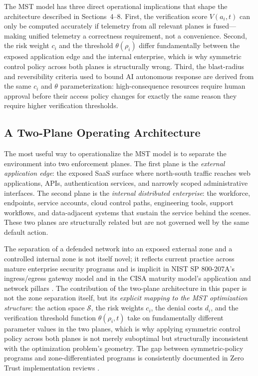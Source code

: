 \documentclass[acmlarge]{acmart}
\begin{document}
The MST model has three direct operational implications that shape the
architecture described in Sections~4--8. First, the verification score
$V(a_i, t)$ can only be computed accurately if telemetry from all relevant
planes is fused---making unified telemetry a correctness requirement, not a
convenience. Second, the risk weight $c_i$ and the threshold $\theta(\rho_i)$
differ fundamentally between the exposed application edge and the internal enterprise,
which is why symmetric control policy across both planes is structurally wrong.
Third, the blast-radius and reversibility criteria used to bound AI autonomous
response are derived from the same $c_i$ and $\theta$ parameterization:
high-consequence resources require human approval before their access policy changes
for exactly the same reason they require higher verification thresholds.

\subsection{A Two-Plane Operating Architecture}
\label{sec:twoplane}

The most useful way to operationalize the MST model is to separate the environment into two
enforcement planes. The first plane is the \textit{external application edge}: the exposed
SaaS surface where north-south traffic reaches web applications, APIs, authentication
services, and narrowly scoped administrative interfaces. The second plane is the
\textit{internal distributed enterprise}: the workforce, endpoints, service accounts, cloud
control paths, engineering tools, support workflows, and data-adjacent systems that
sustain the service behind the scenes. These two planes are structurally related but are
not governed well by the same default action.

The separation of a defended network into an exposed external zone and a controlled internal
zone is not itself novel; it reflects current practice across mature enterprise security
programs and is implicit in NIST SP 800-207A's ingress/egress gateway model
\cite{chandramouli2023} and in the CISA maturity model's application and network pillars
\cite{cisa2023}. The contribution of the two-plane architecture in this paper is not the
zone separation itself, but its \textit{explicit mapping to the MST optimization
structure}: the action space $\mathcal{S}$, the risk weights $c_i$, the denial costs
$d_i$, and the verification threshold function $\theta(\rho_i, t)$ take on fundamentally
different parameter values in the two planes, which is why applying symmetric control
policy across both planes is not merely suboptimal but structurally inconsistent with
the optimization problem's geometry. The gap between symmetric-policy programs and zone-differentiated programs is
consistently documented in Zero Trust implementation reviews \cite{buck2021}.
\end{document}
